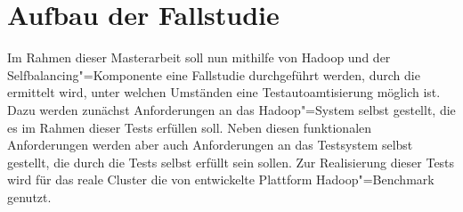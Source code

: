 \chapter{Aufbau der Fallstudie}
\label{sec:fallstudie}

Im Rahmen dieser Masterarbeit soll nun mithilfe von Hadoop und der Selfbalancing"=Komponente eine Fallstudie durchgeführt werden, durch die ermittelt wird, unter welchen Umständen eine Testautoamtisierung möglich ist.
Dazu werden zunächst Anforderungen an das Hadoop"=System selbst gestellt, die es im Rahmen dieser Tests erfüllen soll.
Neben diesen funktionalen Anforderungen werden aber auch Anforderungen an das Testsystem selbst gestellt, die durch die Tests selbst erfüllt sein sollen.
Zur Realisierung dieser Tests wird für das reale Cluster die von \citeauthor{zhang2016} entwickelte Plattform Hadoop"=Benchmark genutzt.






